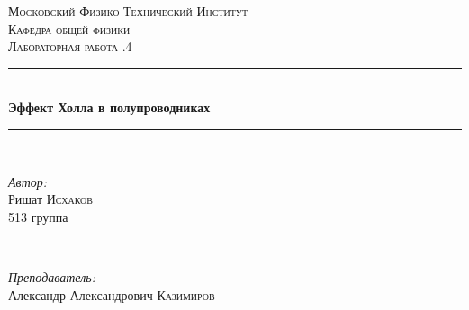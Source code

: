 \documentclass[a4paper, 12pt]{article}
\begin{document}
\begin{titlepage}

\newcommand{\HRule}{\rule{\linewidth}{0.5mm}} %

\center %
 

\textsc{\LARGE Московский Физико-Технический Институт}\\[1,5cm] %
\textsc{\Large Кафедра общей физики}\\[0.5cm] %
\textsc{\large Лабораторная работа .4}\\[0.5cm] %


\HRule
\\[0.4cm]
{ \huge \bfseries Эффект Холла в полупроводниках}
\\[0.2cm] %
\HRule
\\[1.5cm]


 

\begin{minipage}{0.4\textwidth}
	\begin{flushleft} \large
		\emph{Автор:}\\
		Ришат \textsc{Исхаков} \\
		513 группа
	\end{flushleft}
\end{minipage}
~
\begin{minipage}{0.4\textwidth}
	\begin{flushright} \large
		\emph{Преподаватель:} \\
		Александр Александрович \textsc{Казимиров} %
	\end{flushright}
\end{minipage}


\end{titlepage}
\end{document}
